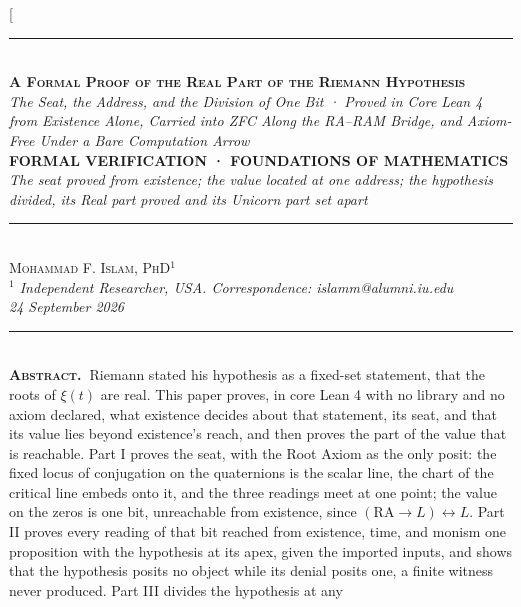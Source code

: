 \documentclass[10pt,twocolumn]{article}
\begin{document}
\twocolumn[{%
\begin{center}
{\color{accent}\rule{0.6\textwidth}{0.8pt}}\\[10pt]
{\bfseries\scshape\fontsize{20}{23}\selectfont A Formal Proof of the
Real Part of the Riemann Hypothesis}\\[7pt]
{\itshape\large The Seat, the Address, and the Division of One Bit ·
Proved in Core Lean 4 from Existence Alone, Carried into ZFC Along the
RA--RAM Bridge, and Axiom-Free Under a Bare Computation Arrow}\\[8pt]
{\footnotesize\color{accent}\scshape\bfseries FORMAL VERIFICATION ·
FOUNDATIONS OF MATHEMATICS}\\[3pt]
{\itshape\color{deep}\small The seat proved from existence; the value
located at one address; the hypothesis divided, its Real part proved and
its Unicorn part set apart}\\[9pt]
{\color{accent}\rule{0.6\textwidth}{0.8pt}}\\[10pt]
{\scshape Mohammad F. Islam, PhD\(^{1}\)}\\[2pt]
{\itshape\color{faint}\small \(^{1}\) Independent Researcher, USA.
Correspondence: islamm@alumni.iu.edu}\\[2pt]
{\itshape\color{faint}\small 24 September 2026}\\[14pt]
\end{center}
\begin{minipage}{\textwidth}
{\color{accent}\rule{\textwidth}{0.6pt}}\\[4pt]
{\small\hspace{1em}\textbf{\scshape\color{deep}Abstract.\ }Riemann
stated his hypothesis as a fixed-set statement, that the roots of
\(\xi(t)\) are real. This paper proves, in core Lean 4 with no library
and no axiom declared, what existence decides about that statement, its
seat, and that its value lies beyond existence's reach, and then proves
the part of the value that is reachable. Part I proves the seat, with
the Root Axiom as the only posit: the fixed locus of conjugation on the
quaternions is the scalar line, the chart of the critical line embeds
onto it, and the three readings meet at one point; the value on the
zeros is one bit, unreachable from existence, since
\((\mathrm{RA} \to L) \leftrightarrow L\). Part II proves every reading
of that bit reached from existence, time, and monism one proposition
with the hypothesis at its apex, given the imported inputs, and shows
that the hypothesis posits no object while its denial posits one, a
finite witness never produced. Part III divides the hypothesis at any
}
\end{minipage}}
\end{document}
